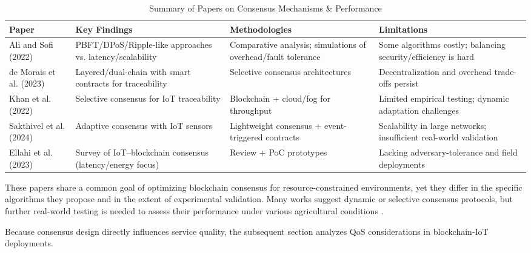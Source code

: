 \documentclass[12pt,onecolumn]{IEEEtran} %
\newcommand{\fitToPage}[1]{\begin{adjustbox}{max width=\textwidth}#1\end{adjustbox}}
\renewcommand{\arraystretch}{1.2}
\begin{document}
\begin{table}[htbp]
\caption{Summary of Papers on Consensus Mechanisms \& Performance}
\label{table3}
\centering
\fitToPage{
\begingroup
\setlength{\tabcolsep}{4pt}
\renewcommand{\arraystretch}{1.15}
\footnotesize
\begin{tabularx}{\textwidth}{@{}P{0.18\textwidth}YYY@{}}
\toprule
\textbf{Paper} & \textbf{Key Findings} & \textbf{Methodologies} & \textbf{Limitations} \\
\midrule
Ali and Sofi (2022) & PBFT/DPoS/Ripple-like approaches vs. latency/scalability & Comparative analysis; simulations of overhead/fault tolerance & Some algorithms costly; balancing security/efficiency is hard \\
\addlinespace
de Morais et al. (2023) & Layered/dual-chain with smart contracts for traceability & Selective consensus architectures & Decentralization and overhead trade-offs persist \\
\addlinespace
Khan et al. (2022) & Selective consensus for IoT traceability & Blockchain + cloud/fog for throughput & Limited empirical testing; dynamic adaptation challenges \\
\addlinespace
Sakthivel et al. (2024) & Adaptive consensus with IoT sensors & Lightweight consensus + event-triggered contracts & Scalability in large networks; insufficient real-world validation \\
\addlinespace
Ellahi et al. (2023) & Survey of IoT–blockchain consensus (latency/energy focus) & Review + PoC prototypes & Lacking adversary-tolerance and field deployments \\
\bottomrule
\end{tabularx}
\endgroup
}
\end{table}



These papers share a common goal of optimizing blockchain consensus for resource-constrained environments, yet they differ in the specific algorithms they propose and in the extent of experimental validation. Many works suggest dynamic or selective consensus protocols, but further real-world testing is needed to assess their performance under various agricultural conditions \cite{ali2022blockchainenabledarchitecture, sakthivel2024enhancingtransparencyand}.

Because consensus design directly influences service quality, the subsequent section analyzes QoS considerations in blockchain-IoT deployments.
\end{document}
